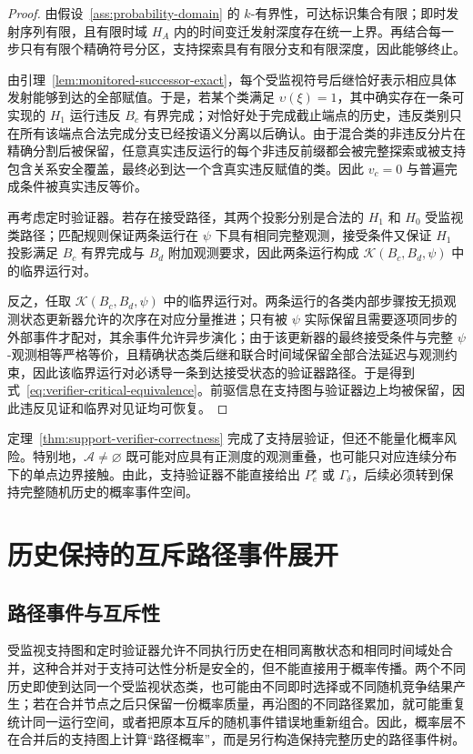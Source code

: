 \documentclass[master,fontset=ubuntu]{shnuthesis}
\theoremstyle{definition}
\begin{document}
\begin{proof}
由假设~\ref{ass:probability-domain} 的 \(k\)-有界性，可达标识集合有限；即时发射序列有限，且有限时域 \(H_A\) 内的时间变迁发射深度存在统一上界。再结合每一步只有有限个精确符号分区，支持探索具有有限分支和有限深度，因此能够终止。

由引理~\ref{lem:monitored-successor-exact}，每个受监视符号后继恰好表示相应具体发射能够到达的全部赋值。于是，若某个类满足 \(\upsilon(\xi)=1\)，其中确实存在一条可实现的 \(H_1\) 运行违反 \(B_c\) 有界完成；对恰好处于完成截止端点的历史，违反类别只在所有该端点合法完成分支已经按语义分离以后确认。由于混合类的非违反分片在精确分割后被保留，任意真实违反运行的每个非违反前缀都会被完整探索或被支持包含关系安全覆盖，最终必到达一个含真实违反赋值的类。因此 \(v_c=0\) 与普遍完成条件被真实违反等价。

再考虑定时验证器。若存在接受路径，其两个投影分别是合法的 \(H_1\) 和 \(H_0\) 受监视类路径；匹配规则保证两条运行在 \(\psi\) 下具有相同完整观测，接受条件又保证 \(H_1\) 投影满足 \(B_c\) 有界完成与 \(B_d\) 附加观测要求，因此两条运行构成 \(\mathcal K(B_c,B_d,\psi)\) 中的临界运行对。

反之，任取 \(\mathcal K(B_c,B_d,\psi)\) 中的临界运行对。两条运行的各类内部步骤按无损观测状态更新器允许的次序在对应分量推进；只有被 \(\psi\) 实际保留且需要逐项同步的外部事件才配对，其余事件允许异步演化；由于该更新器的最终接受条件与完整 \(\psi\)-观测相等严格等价，且精确状态类后继和联合时间域保留全部合法延迟与观测约束，因此该临界运行对必诱导一条到达接受状态的验证器路径。于是得到式~\eqref{eq:verifier-critical-equivalence}。前驱信息在支持图与验证器边上均被保留，因此违反见证和临界对见证均可恢复。
\end{proof}

定理~\ref{thm:support-verifier-correctness} 完成了支持层验证，但还不能量化概率风险。特别地，\(\mathcal A\neq\varnothing\) 既可能对应具有正测度的观测重叠，也可能只对应连续分布下的单点边界接触。由此，支持验证器不能直接给出 \(P_e^\star\) 或 \(\Gamma_\delta\)，后续必须转到保持完整随机历史的概率事件空间。

\section{历史保持的互斥路径事件展开}

\subsection{路径事件与互斥性}

受监视支持图和定时验证器允许不同执行历史在相同离散状态和相同时间域处合并，这种合并对于支持可达性分析是安全的，但不能直接用于概率传播。两个不同历史即使到达同一个受监视状态类，也可能由不同即时选择或不同随机竞争结果产生；若在合并节点之后只保留一份概率质量，再沿图的不同路径累加，就可能重复统计同一运行空间，或者把原本互斥的随机事件错误地重新组合。因此，概率层不在合并后的支持图上计算“路径概率”，而是另行构造保持完整历史的路径事件树。
\end{document}
